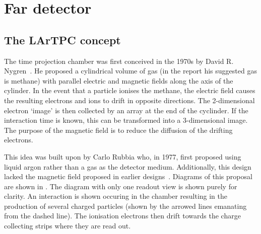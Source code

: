 \section{Far detector}
\label{sec:dune:fd}

\subsection{The LArTPC concept}
\label{sec:dune:fd:lartpc}
The time projection chamber was first conceived in the 1970s by David R. Nygren~\cite{nygrenProp}.
He proposed a cylindrical volume of gas (in the report his suggested gas is methane) with parallel electric and magnetic fields along the axis of the cylinder.
In the event that a particle ionises the methane, the electric field causes the resulting electrons and ions to drift in opposite directions.
The 2-dimensional electron `image' is then collected by an array at the end of the cyclinder.
If the interaction time is known, this can be transformed into a 3-dimensional image. 
The purpose of the magnetic field is to reduce the diffusion of the drifting electrons.

This idea was built upon by Carlo Rubbia who, in 1977, first proposed using liquid argon rather than a gas as the detector medium.
Additionally, this design lacked the magnetic field proposed in earlier designs~\cite{rubbiaProp}.
Diagrams of this proposal are shown in .
The diagram with only one readout view is shown purely for clarity.
An interaction is shown occuring in the chamber resulting in the production of several charged particles (shown by the arrowed lines emanating from the dashed line).
The ionisation electrons then drift towards the charge collecting strips where they are read out.
 
